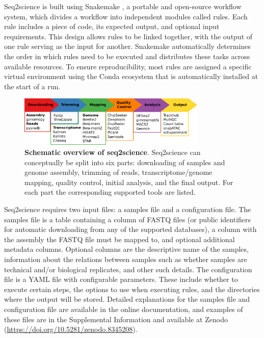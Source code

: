 Seq2science is built using Snakemake \cite{snakemake}, a portable and open-source workflow system, which divides a workflow into independent modules called rules. Each rule includes a piece of code, its expected output, and optional input requirements. This design allows rules to be linked together, with the output of one rule serving as the input for another. Snakemake automatically determines the order in which rules need to be executed and distributes these tasks across available resources. To ensure reproducibility, most rules are assigned a specific virtual environment using the Conda ecosystem \cite{anaconda} that is automatically installed at the start of a run.

\begin{figure}
	\centering
	\includegraphics[width=0.8\textwidth]{ch.seq2science/imgs/figure_overview.png}
	\caption{\label{fig:overview} \textbf{Schematic overview of seq2science}. Seq2science can conceptually be split into six parts: downloading of samples and genome assembly, trimming of reads, transcriptome/genome mapping, quality control, initial analysis, and the final output. For each part the corresponding supported tools are listed. }
\end{figure}

Seq2science requires two input files: a samples file and a configuration file. The samples file is a table containing a column of FASTQ files (or public identifiers for automatic downloading from any of the supported databases), a column with the assembly the FASTQ file must be mapped to, and optional additional metadata columns. Optional columns are the descriptive name of the samples, information about the relations between samples such as whether samples are technical and/or biological replicates, and other such details. The configuration file is a YAML file with configurable parameters. These include whether to execute certain steps, the options to use when executing rules, and the directories where the output will be stored. Detailed explanations for the samples file and configuration file are available in the online documentation, and examples of these files are in the Supplemental Information and available at Zenodo (\url{https://doi.org/10.5281/zenodo.8345208}).

